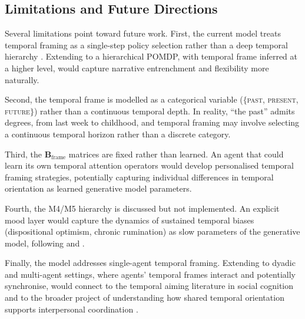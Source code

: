 \documentclass[11pt,a4paper]{article}
\begin{document}
\subsection{Limitations and Future Directions}\label{sec:limitations}

Several limitations point toward future work. First, the current model treats temporal framing as a single-step policy selection rather than a deep temporal hierarchy \citep{friston2018deep}. Extending to a hierarchical POMDP, with temporal frame inferred at a higher level, would capture narrative entrenchment and flexibility more naturally.

Second, the temporal frame is modelled as a categorical variable ($\{$\textsc{past}, \textsc{present}, \textsc{future}$\}$) rather than a continuous temporal depth. In reality, ``the past'' admits degrees, from last week to childhood, and temporal framing may involve selecting a continuous temporal horizon rather than a discrete category.

Third, the $\mathbf{B}_{\text{frame}}$ matrices are fixed rather than learned. An agent that could learn its own temporal attention operators would develop personalised temporal framing strategies, potentially capturing individual differences in temporal orientation as learned generative model parameters.

Fourth, the M4/M5 hierarchy is discussed but not implemented. An explicit mood layer would capture the dynamics of sustained temporal biases (dispositional optimism, chronic rumination) as slow parameters of the generative model, following \citet{hesp2021deeply} and \citet{pezzulo2018hierarchical}.

Finally, the model addresses single-agent temporal framing. Extending to dyadic and multi-agent settings, where agents' temporal frames interact and potentially synchronise, would connect to the temporal aiming literature in social cognition \citep{hinrichs2025temporal} and to the broader project of understanding how shared temporal orientation supports interpersonal coordination \citep{eldar2016mood}.



\end{document}

